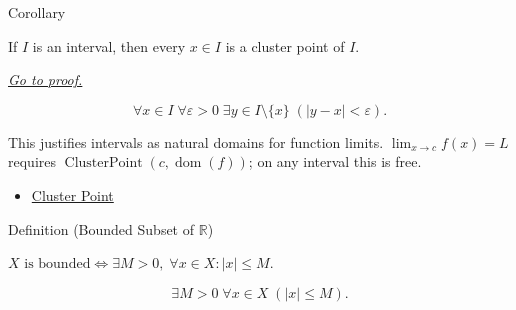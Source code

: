 
\begin{corollarybox}{Corollary}
\begin{corollary}
\label{cor:interval-all-limit-points}
If $I$ is an interval, then every $x\in I$ is a cluster point of $I$.

\smallskip\noindent
\hyperref[prf:interval-all-limit-points]{\textit{Go to proof.}}
\end{corollary}
\end{corollarybox}

\begin{remark*}
\[
  \forall x\in I\;\forall\varepsilon>0\;\exists y\in I\setminus\{x\}\;(|y-x|<\varepsilon).
\]
\end{remark*}

\begin{remark*}[Interpretation]
This justifies intervals as natural domains for function limits.
$\lim_{x\to c}f(x)=L$ requires
$\operatorname{ClusterPoint}(c, \operatorname{dom}(f))$; on any
interval this is free.
\end{remark*}

\begin{dependencies}
\begin{itemize}
  \item \hyperref[def:cluster-point-r]{Cluster Point}
\end{itemize}
\end{dependencies}


\begin{definitionbox}{Definition (Bounded Subset of $\mathbb{R}$)}
\begin{definition}
\label{def:bounded-set-r}
$X\text{ is bounded} \iff \exists M>0,\;\forall x\in X:
|x|\leq M$.
\end{definition}
\end{definitionbox}

\begin{remark*}
\[
  \exists M>0\;\forall x\in X\;(|x|\leq M).
\]
\end{remark*}

